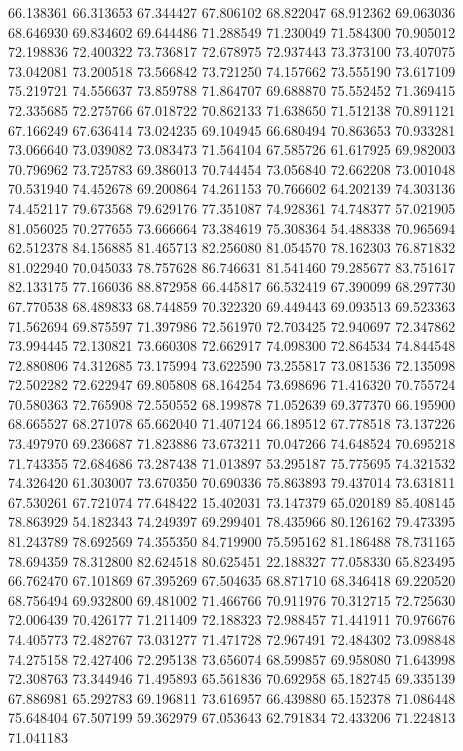 66.138361
66.313653
67.344427
67.806102
68.822047
68.912362
69.063036
68.646930
69.834602
69.644486
71.288549
71.230049
71.584300
70.905012
72.198836
72.400322
73.736817
72.678975
72.937443
73.373100
73.407075
73.042081
73.200518
73.566842
73.721250
74.157662
73.555190
73.617109
75.219721
74.556637
73.859788
71.864707
69.688870
75.552452
71.369415
72.335685
72.275766
67.018722
70.862133
71.638650
71.512138
70.891121
67.166249
67.636414
73.024235
69.104945
66.680494
70.863653
70.933281
73.066640
73.039082
73.083473
71.564104
67.585726
61.617925
69.982003
70.796962
73.725783
69.386013
70.744454
73.056840
72.662208
73.001048
70.531940
74.452678
69.200864
74.261153
70.766602
64.202139
74.303136
74.452117
79.673568
79.629176
77.351087
74.928361
74.748377
57.021905
81.056025
70.277655
73.666664
73.384619
75.308364
54.488338
70.965694
62.512378
84.156885
81.465713
82.256080
81.054570
78.162303
76.871832
81.022940
70.045033
78.757628
86.746631
81.541460
79.285677
83.751617
82.133175
77.166036
88.872958
66.445817
66.532419
67.390099
68.297730
67.770538
68.489833
68.744859
70.322320
69.449443
69.093513
69.523363
71.562694
69.875597
71.397986
72.561970
72.703425
72.940697
72.347862
73.994445
72.130821
73.660308
72.662917
74.098300
72.864534
74.844548
72.880806
74.312685
73.175994
73.622590
73.255817
73.081536
72.135098
72.502282
72.622947
69.805808
68.164254
73.698696
71.416320
70.755724
70.580363
72.765908
72.550552
68.199878
71.052639
69.377370
66.195900
68.665527
68.271078
65.662040
71.407124
66.189512
67.778518
73.137226
73.497970
69.236687
71.823886
73.673211
70.047266
74.648524
70.695218
71.743355
72.684686
73.287438
71.013897
53.295187
75.775695
74.321532
74.326420
61.303007
73.670350
70.690336
75.863893
79.437014
73.631811
67.530261
67.721074
77.648422
15.402031
73.147379
65.020189
85.408145
78.863929
54.182343
74.249397
69.299401
78.435966
80.126162
79.473395
81.243789
78.692569
74.355350
84.719900
75.595162
81.186488
78.731165
78.694359
78.312800
82.624518
80.625451
22.188327
77.058330
65.823495
66.762470
67.101869
67.395269
67.504635
68.871710
68.346418
69.220520
68.756494
69.932800
69.481002
71.466766
70.911976
70.312715
72.725630
72.006439
70.426177
71.211409
72.188323
72.988457
71.441911
70.976676
74.405773
72.482767
73.031277
71.471728
72.967491
72.484302
73.098848
74.275158
72.427406
72.295138
73.656074
68.599857
69.958080
71.643998
72.308763
73.344946
71.495893
65.561836
70.692958
65.182745
69.335139
67.886981
65.292783
69.196811
73.616957
66.439880
65.152378
71.086448
75.648404
67.507199
59.362979
67.053643
62.791834
72.433206
71.224813
71.041183
